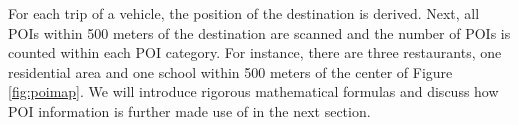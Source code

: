 \documentclass[sii]{ipart}
\theoremstyle{plain}
\begin{document}
For each trip of a vehicle, the position of the destination is derived. Next, all POIs within 500 meters of the destination are scanned and the number of POIs is counted within each POI category. For instance, there are three restaurants, one residential area and one school within 500 meters of the center of Figure \ref{fig:poimap}.
We will introduce rigorous mathematical formulas and discuss how POI information is further made use of in the next section.

\end{document}
